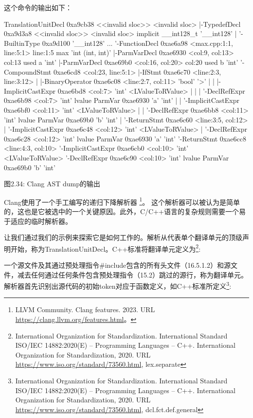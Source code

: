 
这个命令的输出如下：

\begin{shell}
TranslationUnitDecl 0xa9cb38 <<invalid sloc>> <invalid sloc>
|-TypedefDecl 0xa9d3a8 <<invalid sloc>> <invalid sloc>
implicit __int128_t '__int128'
| '-BuiltinType 0xa9d100 '__int128'
...
'-FunctionDecl 0xae6a98 <max.cpp:1:1, line:5:1> line:1:5 max
'int (int, int)'
  |-ParmVarDecl 0xae6930 <col:9, col:13> col:13 used a 'int'
  |-ParmVarDecl 0xae69b0 <col:16, col:20> col:20 used b 'int'
  '-CompoundStmt 0xae6cd8 <col:23, line:5:1>
    |-IfStmt 0xae6c70 <line:2:3, line:3:12>
    | |-BinaryOperator 0xae6c08 <line:2:7, col:11> 'bool' '>'
    | | |-ImplicitCastExpr 0xae6bd8 <col:7> 'int' <LValueToRValue>
    | | | '-DeclRefExpr 0xae6b98 <col:7> 'int' lvalue ParmVar 0xae6930
            'a' 'int'
    | | '-ImplicitCastExpr 0xae6bf0 <col:11> 'int' <LValueToRValue>
    | |   '-DeclRefExpr 0xae6bb8 <col:11> 'int' lvalue ParmVar 0xae69b0
            'b' 'int'
    | '-ReturnStmt 0xae6c60 <line:3:5, col:12>
    |   '-ImplicitCastExpr 0xae6c48 <col:12> 'int' <LValueToRValue>
    |     '-DeclRefExpr 0xae6c28 <col:12> 'int' lvalue ParmVar 0xae6930
            'a' 'int'
    '-ReturnStmt 0xae6cc8 <line:4:3, col:10>
      '-ImplicitCastExpr 0xae6cb0 <col:10> 'int' <LValueToRValue>
        '-DeclRefExpr 0xae6c90 <col:10> 'int' lvalue ParmVar 0xae69b0
            'b' 'int'
\end{shell}

\begin{center}
图2.34: Clang AST dump的输出
\end{center}

Clang使用了一个手工编写的递归下降解析器 \footnote{LLVM Community. Clang features. 2023. URL \url{https://clang.llvm.org/features.html}。}。 这个解析器可以被认为是简单的，这也是它被选中的一个关键原因。此外，C/C++语言的复杂规则需要一个易于适应的临时解析器。

让我们通过我们的示例来探索它是如何工作的。解析从代表单个翻译单元的顶级声明开始，称为TranslationUnitDecl。C++标准将翻译单元定义为\footnote{International Organization for Standardization. International Standard ISO/IEC 14882:2020(E) – Programming Languages – C++. International Organization for Standardization, 2020. URL \url{https://www.iso.org/standard/73560.html}, lex.separate}:

一个源文件及其通过预处理指令\#include包含的所有头文件（16.5.1.2）和源文件，减去任何通过任何条件包含预处理指令（15.2）跳过的源行，称为翻译单元。
解析器首先识别出源代码的初始token对应于函数定义，如C++标准所定义\footnote{International Organization for Standardization. International Standard ISO/IEC 14882:2020(E) – Programming Languages – C++. International Organization for Standardization, 2020. URL \url{https://www.iso.org/standard/73560.html}, dcl.fct.def.general}:

